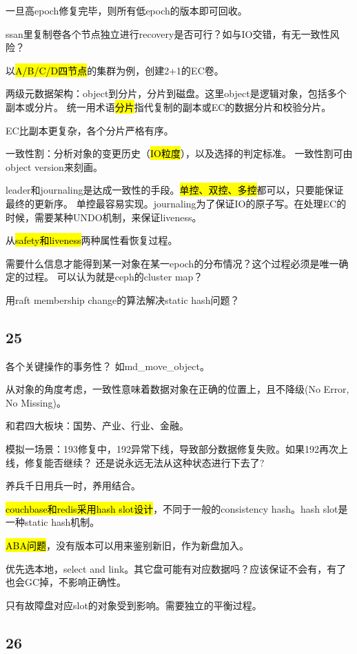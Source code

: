 一旦高epoch修复完毕，则所有低epoch的版本即可回收。

ssan里复制卷各个节点独立进行recovery是否可行？如与IO交错，有无一致性风险？

以\hl{A/B/C/D四节点}的集群为例，创建2+1的EC卷。

\hrulefill

两级元数据架构：object到分片，分片到磁盘。这里object是逻辑对象，包括多个副本或分片。
统一用术语\hl{分片}指代复制的副本或EC的数据分片和校验分片。

EC比副本更复杂，各个分片严格有序。

\hrulefill

一致性割：分析对象的变更历史（\hl{IO粒度}），以及选择的判定标准。
一致性割可由object version来刻画。

leader和journaling是达成一致性的手段。\hl{单控、双控、多控}都可以，只要能保证最终的更新序。
单控最容易实现。journaling为了保证IO的原子写。在处理EC的时候，需要某种UNDO机制，来保证liveness。

从\hl{safety和liveness}两种属性看恢复过程。

需要什么信息才能得到某一对象在某一epoch的分布情况？这个过程必须是唯一确定的过程。
可以认为就是ceph的cluster map？

用raft membership change的算法解决static hash问题？

\subsection{25}

各个关键操作的事务性？ 如md\_move\_object。

从对象的角度考虑，一致性意味着数据对象在正确的位置上，且不降级(No Error, No Missing)。

和君四大板块：国势、产业、行业、金融。

模拟一场景：193修复中，192异常下线，导致部分数据修复失败。如果192再次上线，修复能否继续？
还是说永远无法从这种状态进行下去了?

养兵千日用兵一时，养用结合。

\hl{couchbase和redis采用hash slot设计}，不同于一般的consistency hash。hash slot是一种static hash机制。

\hl{ABA问题}，没有版本可以用来鉴别新旧，作为新盘加入。

优先选本地，select and link。其它盘可能有对应数据吗？应该保证不会有，有了也会GC掉，不影响正确性。

只有故障盘对应slot的对象受到影响。需要独立的平衡过程。

\subsection{26}

